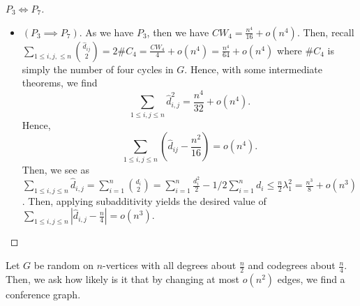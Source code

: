 \begin{proof}[\(P_3 \iff P_7\)]
	\begin{itemize}
		\item \(\left( P_3 \implies P_7 \right) \). As we have \(P_3\), then we have \(CW_4 = \frac{n^{4}}{16} + o(n^{4})\). Then, recall \(\sum_{1 \le i, j, \le n}^{} \binom{\hat{d}_{ij}}{2} = 2\#C_4 = \frac{CW_4}{4} + o\left( n^{4} \right) = \frac{n^{4}}{64} + o(n^{4})\) where \(\#C_4\) is simply the number of four cycles in \(G\). Hence, with some intermediate theorems, we find \[
			\sum_{1\le i, j \le n}^{} \hat{d}_{i, j}^2= \frac{n^{4}}{32} + o\left( n^{4} \right) 		.\]
	Hence, \[
		\sum_{1 \le i, j \le n}^{} \left( \hat{d}_{ij} - \frac{n^2}{16} \right) = o\left( n^{4} \right)
	.\] Then, we see as \(\sum_{1 \le i, j \le n}^{}\hat{d}_{i, j} =  \sum_{i= 1}^{n} \binom{d_{i}}{2} = \sum_{i= 1}^{n} \frac{d_{i}^2}{2}  - 1/2 \sum_{i= 1}^{n} d_{i} \le \frac{n}{2} \lambda_1^2 = \frac{n^3}{8} + o\left( n^3 \right) \). Then, applying subadditivity yields the desired value of \(\sum_{1\le i, j \le n}^{} \left| \hat{d}_{i, j} - \frac{n}{4} \right| = o\left( n^3 \right) \).
	\end{itemize}
\end{proof}
\begin{proposition}
	Let \(G\) be random on \(n\)-vertices with all degrees about \(\frac{n}{2}\) and codegrees about \(\frac{n}{4}\). Then, we ask how likely is it that by changing at most \(o\left( n^2 \right) \) edges, we find a conference graph.
\end{proposition}
